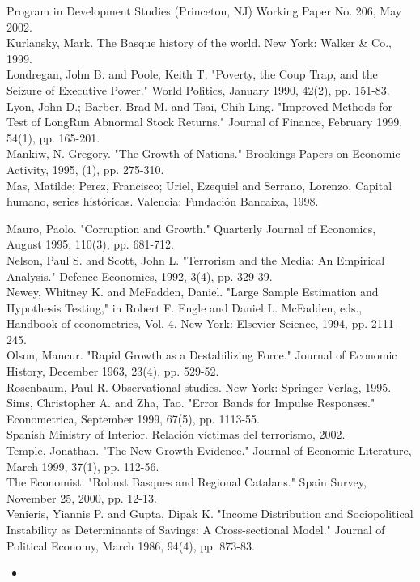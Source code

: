 \documentclass[10pt]{article}
\begin{document}
Program in Development Studies (Princeton, NJ) Working Paper No. 206, May 2002.\\
Kurlansky, Mark. The Basque history of the world. New York: Walker \& Co., 1999.\\
Londregan, John B. and Poole, Keith T. "Poverty, the Coup Trap, and the Seizure of Executive Power." World Politics, January 1990, 42(2), pp. 151-83.\\
Lyon, John D.; Barber, Brad M. and Tsai, Chih Ling. "Improved Methods for Test of LongRun Abnormal Stock Returns." Journal of Finance, February 1999, 54(1), pp. 165-201.\\
Mankiw, N. Gregory. "The Growth of Nations." Brookings Papers on Economic Activity, 1995, (1), pp. 275-310.\\
Mas, Matilde; Perez, Francisco; Uriel, Ezequiel and Serrano, Lorenzo. Capital humano, series históricas. Valencia: Fundación Bancaixa, 1998.

Mauro, Paolo. "Corruption and Growth." Quarterly Journal of Economics, August 1995, 110(3), pp. 681-712.\\
Nelson, Paul S. and Scott, John L. "Terrorism and the Media: An Empirical Analysis." Defence Economics, 1992, 3(4), pp. 329-39.\\
Newey, Whitney K. and McFadden, Daniel. "Large Sample Estimation and Hypothesis Testing," in Robert F. Engle and Daniel L. McFadden, eds., Handbook of econometrics, Vol. 4. New York: Elsevier Science, 1994, pp. 2111-245.\\
Olson, Mancur. "Rapid Growth as a Destabilizing Force." Journal of Economic History, December 1963, 23(4), pp. 529-52.\\
Rosenbaum, Paul R. Observational studies. New York: Springer-Verlag, 1995.\\
Sims, Christopher A. and Zha, Tao. "Error Bands for Impulse Responses." Econometrica, September 1999, 67(5), pp. 1113-55.\\
Spanish Ministry of Interior. Relación víctimas del terrorismo, 2002.\\
Temple, Jonathan. "The New Growth Evidence." Journal of Economic Literature, March 1999, 37(1), pp. 112-56.\\
The Economist. "Robust Basques and Regional Catalans." Spain Survey, November 25, 2000, pp. 12-13.\\
Venieris, Yiannis P. and Gupta, Dipak K. "Income Distribution and Sociopolitical Instability as Determinants of Savings: A Cross-sectional Model." Journal of Political Economy, March 1986, 94(4), pp. 873-83.

\begin{itemize}
  \item 
\end{itemize}
\end{document}
